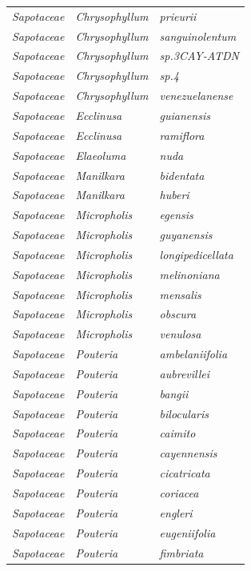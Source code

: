 \documentclass[fleqn,10pt]{ArtEcoFoG} %
\begin{document}
\begin{table}[t]
\begin{tabular}{lll}
\em{Sapotaceae} & \em{Chrysophyllum} & \em{prieurii}\\
\em{Sapotaceae} & \em{Chrysophyllum} & \em{sanguinolentum}\\
\em{Sapotaceae} & \em{Chrysophyllum} & \em{sp.3CAY-ATDN}\\
\em{Sapotaceae} & \em{Chrysophyllum} & \em{sp.4}\\
\addlinespace
\em{Sapotaceae} & \em{Chrysophyllum} & \em{venezuelanense}\\
\em{Sapotaceae} & \em{Ecclinusa} & \em{guianensis}\\
\em{Sapotaceae} & \em{Ecclinusa} & \em{ramiflora}\\
\em{Sapotaceae} & \em{Elaeoluma} & \em{nuda}\\
\em{Sapotaceae} & \em{Manilkara} & \em{bidentata}\\
\addlinespace
\em{Sapotaceae} & \em{Manilkara} & \em{huberi}\\
\em{Sapotaceae} & \em{Micropholis} & \em{egensis}\\
\em{Sapotaceae} & \em{Micropholis} & \em{guyanensis}\\
\em{Sapotaceae} & \em{Micropholis} & \em{longipedicellata}\\
\em{Sapotaceae} & \em{Micropholis} & \em{melinoniana}\\
\addlinespace
\em{Sapotaceae} & \em{Micropholis} & \em{mensalis}\\
\em{Sapotaceae} & \em{Micropholis} & \em{obscura}\\
\em{Sapotaceae} & \em{Micropholis} & \em{venulosa}\\
\em{Sapotaceae} & \em{Pouteria} & \em{ambelaniifolia}\\
\em{Sapotaceae} & \em{Pouteria} & \em{aubrevillei}\\
\addlinespace
\em{Sapotaceae} & \em{Pouteria} & \em{bangii}\\
\em{Sapotaceae} & \em{Pouteria} & \em{bilocularis}\\
\em{Sapotaceae} & \em{Pouteria} & \em{caimito}\\
\em{Sapotaceae} & \em{Pouteria} & \em{cayennensis}\\
\em{Sapotaceae} & \em{Pouteria} & \em{cicatricata}\\
\addlinespace
\em{Sapotaceae} & \em{Pouteria} & \em{coriacea}\\
\em{Sapotaceae} & \em{Pouteria} & \em{engleri}\\
\em{Sapotaceae} & \em{Pouteria} & \em{eugeniifolia}\\
\em{Sapotaceae} & \em{Pouteria} & \em{fimbriata}\\

\end{tabular}
\end{table}
\end{document}
